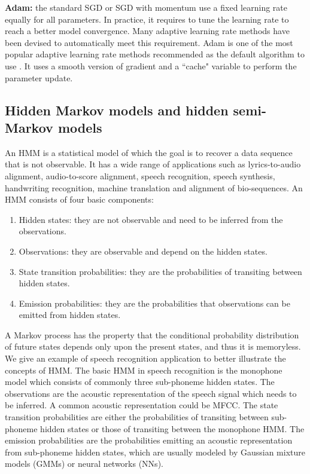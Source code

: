 \noindent\textbf{Adam:} the standard \gls{SGD} or \gls{SGD} with momentum use a fixed learning rate equally for all parameters. In practice, it requires to tune the learning rate to reach a better model convergence. Many adaptive learning rate methods have been devised to automatically meet this requirement. Adam \cite{kingma2014adam} is one of the most popular adaptive learning rate methods recommended as the default algorithm to use \cite{Stanforduniversity}. It uses a smooth version of gradient and a ``cache" variable to perform the parameter update.

\subsection{Hidden Markov models and hidden semi-Markov models}

An \gls{HMM} is a statistical model of which the goal is to recover a data sequence that is not observable. It has a wide range of applications such as lyrics-to-audio alignment, audio-to-score alignment, speech recognition, speech synthesis, handwriting recognition, machine translation and alignment of bio-sequences. An \gls{HMM} consists of four basic components:

\begin{enumerate}[noitemsep]
\item Hidden states: they are not observable and need to be inferred from the observations.
\item Observations: they are observable and depend on the hidden states.
\item State transition probabilities: they are the probabilities of transiting between hidden states.
\item Emission probabilities: they are the probabilities that observations can be emitted from hidden states.
\end{enumerate}

A Markov process has the property that the conditional probability distribution of future states depends only upon the present states, and thus it is memoryless. We give an example of speech recognition application to better illustrate the concepts of \gls{HMM}. The basic \gls{HMM} in speech recognition is the monophone model which consists of commonly three sub-phoneme hidden states. The observations are the acoustic representation of the speech signal which needs to be inferred. A common acoustic representation could be \gls{MFCC}. The state transition probabilities are either the probabilities of transiting between sub-phoneme hidden states or those of transiting between the monophone \gls{HMM}. The emission probabilities are the probabilities emitting an acoustic representation from sub-phoneme hidden states, which are usually modeled by Gaussian mixture models (\gls{GMM}s) or neural networks (NNs).

